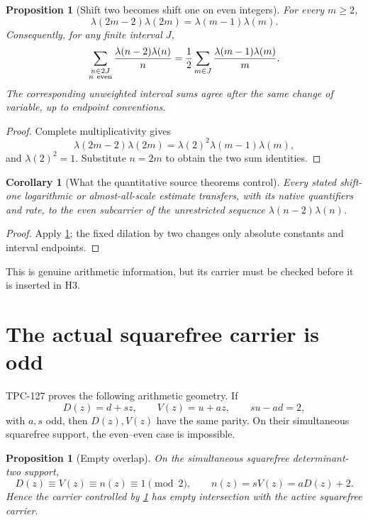\documentclass[11pt]{article}
\newtheorem{proposition}[theorem]{Proposition}
\newtheorem{corollary}[theorem]{Corollary}
\theoremstyle{definition}
\theoremstyle{remark}
\begin{document}
\begin{proposition}[Shift two becomes shift one on even integers]
\label{prop:even}
For every \(m\ge2\),
\begin{equation}
\boxed{
 \lambda(2m-2)\lambda(2m)
 =
 \lambda(m-1)\lambda(m).}
\label{eq:even}
\end{equation}
Consequently, for any finite interval \(J\),
\begin{equation}
 \sum_{\substack{n\in2J\\n\ {\rm even}}}
 \frac{\lambda(n-2)\lambda(n)}n
 =
 \frac12\sum_{m\in J}
 \frac{\lambda(m-1)\lambda(m)}m.
\label{eq:harmonic-transfer}
\end{equation}
The corresponding unweighted interval sums agree after the same
change of variable, up to endpoint conventions.
\end{proposition}

\begin{proof}
Complete multiplicativity gives
\[
 \lambda(2m-2)\lambda(2m)
 =
 \lambda(2)^2\lambda(m-1)\lambda(m),
\]
and \(\lambda(2)^2=1\).  Substitute \(n=2m\) to obtain the two sum
identities.
\end{proof}

\begin{corollary}[What the quantitative source theorems control]
\label{cor:shadow}
Every stated shift-one logarithmic or almost-all-scale estimate
transfers, with its native quantifiers and rate, to the even
subcarrier of the unrestricted sequence
\(\lambda(n-2)\lambda(n)\).
\end{corollary}

\begin{proof}
Apply \cref{prop:even}; the fixed dilation by two changes only
absolute constants and interval endpoints.
\end{proof}

This is genuine arithmetic information, but its carrier must be
checked before it is inserted in H3.

\section{The actual squarefree carrier is odd}

TPC-127 proves the following arithmetic geometry.  If
\[
 D(z)=d+sz,\qquad V(z)=u+az,\qquad su-ad=2,
\]
with \(a,s\) odd, then \(D(z),V(z)\) have the same parity.  On their
simultaneous squarefree support, the even--even case is impossible.

\begin{proposition}[Empty overlap]
\label{prop:empty}
On the simultaneous squarefree determinant-two support,
\[
 D(z)\equiv V(z)\equiv n(z)\equiv1\pmod2,
\qquad n(z)=sV(z)=aD(z)+2.
\]
Hence the carrier controlled by \cref{cor:shadow} has empty
intersection with the active squarefree carrier.
\end{proposition}
\end{document}
